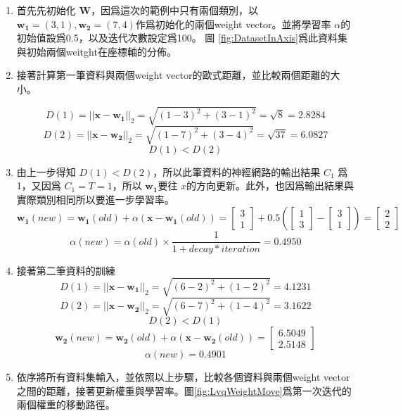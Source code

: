 \newpage
\begin{enumerate}
	\item
	      首先先初始化 \(\mathbf{W}\)，因爲這次的範例中只有兩個類別，以 \(\mathbf{w_1}=(3,1),\mathbf{w_2}=(7,4)\)作爲初始化的兩個weight vector。並將學習率 \(\alpha\)的初始值設爲0.5，以及迭代次數設定爲100。
	      圖 \ref{fig:DatasetInAxis}爲此資料集與初始兩個weitght在座標軸的分佈。
	\item
	      接著計算第一筆資料與兩個weight vector的歐式距離，並比較兩個距離的大小。

	      $$D(1)=||\mathbf{x}-\mathbf{w_1}||_2 = \sqrt{(1-3)^2+(3-1)^2}=\sqrt{8}=2.8284 $$
	      $$D(2)=||\mathbf{x}-\mathbf{w_2}||_2 = \sqrt{(1-7)^2+(3-4)^2}=\sqrt{37}=6.0827 $$
	      $$D(1)<D(2)$$

	\item
	      由上一步得知 \(D(1)<D(2)\)，所以此筆資料的神經網路的輸出結果 \(C_1\) 爲1，又因爲 \(C_1 = T = 1\)，所以 \(\mathbf{w_1}\)要往 \(x\)的方向更新。此外，也因爲輸出結果與實際類別相同所以要進一步學習率。
	      $$\mathbf{w_1}(new) = \mathbf{w_1}(old) + \alpha(\mathbf{x-w_1}(old))= \begin{bmatrix}3\\ 1\end{bmatrix}+0.5(\begin{bmatrix}1\\ 3\end{bmatrix} - \begin{bmatrix}3\\ 1\end{bmatrix})= \begin{bmatrix}2\\ 2\end{bmatrix}  $$
	      $$\alpha(new) = \alpha(old)\times \frac{1}{1+decay*iteration} =0.4950$$

	\item
	      接著第二筆資料的訓練
	      $$D(1)=||\mathbf{x}-\mathbf{w_1}||_2 = \sqrt{(6-2)^2+(1-2)^2}=4.1231 $$
	      $$D(2)=||\mathbf{x}-\mathbf{w_2}||_2 = \sqrt{(6-7)^2+(1-4)^2}=3.1622 $$
	      $$D(2)<D(1)$$
	      $$\mathbf{w_2}(new) = \mathbf{w_2}(old) + \alpha(\mathbf{x-w_2}(old))= \begin{bmatrix} 6.5049 \\ 2.5148 \end{bmatrix}  $$
	      $$\alpha(new) = 0.4901$$




	\item
		依序將所有資料集輸入，並依照以上步驟，比較各個資料與兩個weight vector之間的距離，接著更新權重與學習率。圖\ref{fig:LvqWeightMove}爲第一次迭代的兩個權重的移動路徑。


\end{enumerate}
